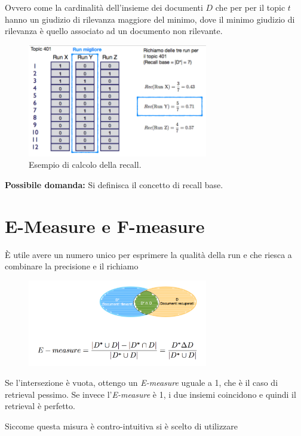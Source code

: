 \noindent Ovvero come la cardinalità dell'insieme dei documenti $D$ che per per il topic $t$ hanno un giudizio di rilevanza maggiore del minimo, dove il minimo giudizio di rilevanza è quello associato ad un documento non rilevante.

\begin{figure}[htbp]
	\centering
	\includegraphics[width=0.7\textwidth]{images/l15-fig-2.png}
	\caption{Esempio di calcolo della recall.}
\end{figure}

\textbf{{\color{Red} Possibile domanda:}} Si definisca il concetto di recall base.
\FloatBarrier
\section{E-Measure e F-measure}

\`E utile avere un numero unico per esprimere la qualità della run e che riesca a combinare la precisione e il richiamo

\begin{figure}[htbp]
	\centering
	\includegraphics[width=0.7\textwidth]{images/l15-fig-3.png}
\end{figure}

Se l'intersezione è vuota, ottengo un \textit{E-measure} uguale a 1, che è il caso di retrieval pessimo.
Se invece l'\textit{E-measure} è 1, i due insiemi coincidono e quindi il retrieval è perfetto.

Siccome questa misura è contro-intuitiva si è scelto di utilizzare

